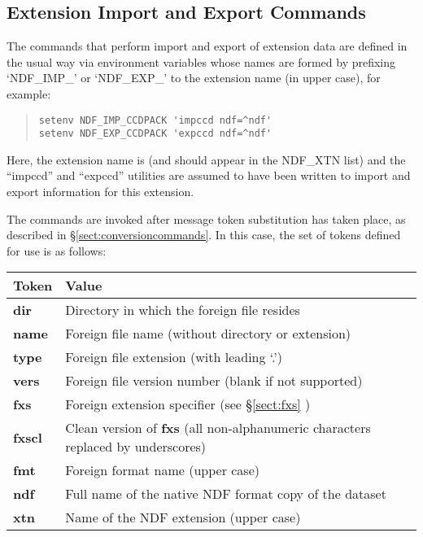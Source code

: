 \subsection{Extension Import and Export Commands}

The commands that perform import and export of extension data are
defined in the usual way via environment variables whose names are
formed by prefixing `NDF\_IMP\_' or `NDF\_EXP\_' to the extension name
(in upper case), for example:

\begin{quote}
\begin{small}
\begin{verbatim}
setenv NDF_IMP_CCDPACK 'impccd ndf=^ndf'
setenv NDF_EXP_CCDPACK 'expccd ndf=^ndf'
\end{verbatim}
\end{small}
\end{quote}

Here, the extension name is  (and should
appear in the NDF\_XTN list) and the ``impccd'' and ``expccd''
utilities are assumed to have been written to import and export
information for this extension.

The commands are invoked after message token substitution has taken
place, as described in \S\ref{sect:conversioncommands}. In this case,
the set of tokens defined for use is as follows:

\begin{center}
\begin{tabular}{|l|l|}
\hline
{\bf Token} & {\bf Value}\\
\hline\hline
{\bf dir}  & Directory in which the foreign file resides\\
{\bf name} & Foreign file name (without directory or extension)\\
{\bf type} & Foreign file extension (with leading `.')\\
{\bf vers} & Foreign file version number (blank if not supported)\\
{\bf fxs}  & Foreign extension specifier (see \S\ref{sect:fxs} )\\
{\bf fxscl} & Clean version of {\bf fxs} (all non-alphanumeric characters
replaced by underscores)\\
{\bf fmt}  & Foreign format name (upper case)\\
{\bf ndf}  & Full name of the native NDF format copy of the dataset\\
{\bf xtn}  & Name of the NDF extension (upper case)\\
\hline
\end{tabular}
\end{center}

